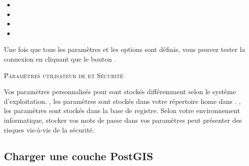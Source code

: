 \begin{itemize}[label=--]
\item {}
\item {}
\item {}
\item {}
\end{itemize}

Une fois que tous les paramètres et les options sont définis, vous pouvez tester la connexion en cliquant que le bouton  .

\begin{Tip}\caption{\textsc{Paramètres utilisateur de \qg et Sécurité}}
Vos paramètres personnalisés pour \qg sont stockés différemment selon le système d'exploitation. \nix, les paramètres sont stockés dans votre répertoire home dans . \win, les paramètres sont stockés dans la base de registre. Selon votre environnement informatique, stocker vos mots de passe dans vos paramètres \qg peut présenter des risques vis-à-vis de la sécurité.
\end{Tip}

\subsection{Charger une couche PostGIS}


